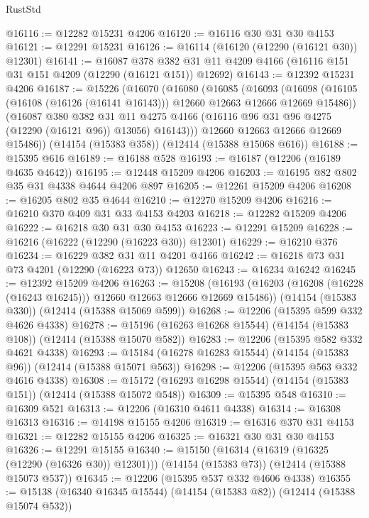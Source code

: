 \begin{lexlean}{RustStd}
\begin{coremodule}
{\begin{coremodule}
{{{{{{{{{{{{{{{{{{{{{{{{{{{{{{{{{{{{{{{{{{{{{{{{{{@16116 := @12282 @15231 @4206
@16120 := @16116 @30 @31 @30 @4153
@16121 := @12291 @15231
@16126 := @16114 (@16120 (@12290 (@16121 @30)) @12301)
@16141 := @16087
    @378
    @382
    @31
    @11
    @4209
    @4166
    (@16116 @151 @31 @151 @4209 (@12290 (@16121 @151)) @12692)
@16143 := @12392 @15231 @4206
@16187 := @15226
    (@16070
      (@16080
        (@16085
          (@16093
            (@16098 (@16105 (@16108 (@16126 (@16141 @16143))) @12660 @12663 @12666 @12669 @15486))
            (@16087
              @380
              @382
              @31
              @11
              @4275
              @4166
              (@16116 @96 @31 @96 @4275 (@12290 (@16121 @96)) @13056)
              @16143)))
        @12660
        @12663
        @12666
        @12669
        @15486))
    (@14154 (@15383 @358))
    (@12414 (@15388 @15068 @616))
@16188 := @15395 @616
@16189 := @16188 @528
@16193 := @16187 (@12206 (@16189 @4635 @4642))
@16195 := @12448 @15209 @4206
@16203 := @16195 @82 @802 @35 @31 @4338 @4644 @4206 @897
@16205 := @12261 @15209 @4206
@16208 := @16205 @802 @35 @4644
@16210 := @12270 @15209 @4206
@16216 := @16210 @370 @409 @31 @33 @4153 @4203
@16218 := @12282 @15209 @4206
@16222 := @16218 @30 @31 @30 @4153
@16223 := @12291 @15209
@16228 := @16216 (@16222 (@12290 (@16223 @30)) @12301)
@16229 := @16210 @376
@16234 := @16229 @382 @31 @11 @4201 @4166
@16242 := @16218 @73 @31 @73 @4201 (@12290 (@16223 @73)) @12650
@16243 := @16234 @16242
@16245 := @12392 @15209 @4206
@16263 := @15208
    (@16193 (@16203 (@16208 (@16228 (@16243 @16245))) @12660 @12663 @12666 @12669 @15486))
    (@14154 (@15383 @330))
    (@12414 (@15388 @15069 @599))
@16268 := @12206 (@15395 @599 @332 @4626 @4338)
@16278 := @15196 (@16263 @16268 @15544) (@14154 (@15383 @108)) (@12414 (@15388 @15070 @582))
@16283 := @12206 (@15395 @582 @332 @4621 @4338)
@16293 := @15184 (@16278 @16283 @15544) (@14154 (@15383 @96)) (@12414 (@15388 @15071 @563))
@16298 := @12206 (@15395 @563 @332 @4616 @4338)
@16308 := @15172 (@16293 @16298 @15544) (@14154 (@15383 @151)) (@12414 (@15388 @15072 @548))
@16309 := @15395 @548
@16310 := @16309 @521
@16313 := @12206 (@16310 @4611 @4338)
@16314 := @16308 @16313
@16316 := @14198 @15155 @4206
@16319 := @16316 @370 @31 @4153
@16321 := @12282 @15155 @4206
@16325 := @16321 @30 @31 @30 @4153
@16326 := @12291 @15155
@16340 := @15150
    (@16314 (@16319 (@16325 (@12290 (@16326 @30)) @12301)))
    (@14154 (@15383 @73))
    (@12414 (@15388 @15073 @537))
@16345 := @12206 (@15395 @537 @332 @4606 @4338)
@16355 := @15138 (@16340 @16345 @15544) (@14154 (@15383 @82)) (@12414 (@15388 @15074 @532))
}}}}}}}}}}}}}}}}}}}}}}}}}}}}}}}}}}}}}}}}}}}}}}}}}}
\end{coremodule}}
\end{coremodule}
\end{lexlean}
